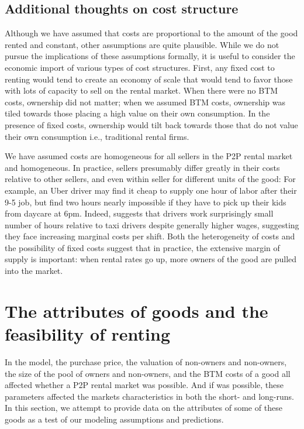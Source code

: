 \documentclass[11pt]{article}
\begin{document}
\subsection{Additional thoughts on cost structure}

Although we have assumed that costs are proportional to the amount of the good rented and constant, other assumptions are quite plausible.
While we do not pursue the implications of these assumptions formally, it is useful to consider the economic import of various types of cost structures.
First, any fixed cost to renting would tend to create an economy of scale that would tend to favor those with lots of capacity to sell on the rental market.
When there were no BTM costs, ownership did not matter;
when we assumed BTM costs, ownership was tiled towards those placing a high value on their own consumption.
In the presence of fixed costs, ownership would tilt back towards those that do not value their own consumption i.e., traditional rental firms. 

We have assumed costs are homogeneous for all sellers in the P2P rental market and homogeneous.
In practice, sellers presumably differ greatly in their costs relative to other sellers, and even within seller for different units of the good:
For example, an Uber driver may find it cheap to supply one hour of labor after their 9-5 job, but find two hours nearly impossible if they have to pick up their kids from daycare at 6pm.  
Indeed, \cite{hall2015analysis} suggests that drivers work surprisingly small number of hours relative to taxi drivers despite generally higher wages, suggesting they face increasing marginal costs per shift. 
Both the heterogeneity of costs and the possibility of fixed costs suggest that in practice, the extensive margin of supply is important:
when rental rates go up, more owners of the good are pulled into the market. 

\section{The attributes of goods and the feasibility of renting}

In the model, the purchase price, the valuation of non-owners and non-owners, the size of the pool of owners and non-owners, and the BTM costs of a good all affected whether a P2P rental market was possible.
And if was possible, these parameters affected the markets characteristics in both the short- and long-runs. 
In this section, we attempt to provide data on the attributes of some of these goods as a test of our modeling assumptions and predictions.  
\end{document}
